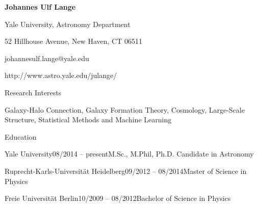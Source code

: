 \documentclass[11pt]{resume} %
\begin{document}
\centerline{\color{blue} \LARGE \bf Johannes Ulf Lange}
\centerline{Yale University, Astronomy Department}
\centerline{52 Hillhouse Avenue, New Haven, CT 06511}
\centerline{johannesulf.lange@yale.edu}
\centerline{http://www.astro.yale.edu/julange/}
\medskip

\begin{rSection}{Research Interests}
  \begin{adjustwidth}{0.5cm}{}
    Galaxy-Halo Connection, Galaxy Formation Theory, Cosmology, Large-Scale Structure, Statistical Methods and Machine Learning
  \end{adjustwidth}
\end{rSection}


\begin{rSection}{Education}
  \begin{adjustwidth}{0.5cm}{}
    \begin{rSubsection}{Yale University}{08/2014 -- present}{M.Sc., M.Phil, Ph.D. Candidate in Astronomy}{}\end{rSubsection}

    \begin{rSubsection}{Ruprecht-Karls-Universität Heidelberg}{09/2012 -- 08/2014}{Master of Science in Physics}{}\end{rSubsection}

    \begin{rSubsection}{Freie Universität Berlin}{10/2009 -- 08/2012}{Bachelor of Science in Physics}{}\end{rSubsection}
  \end{adjustwidth}
\end{rSection}
\end{document}
